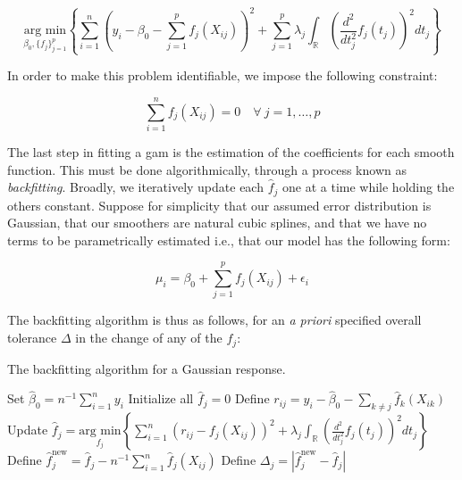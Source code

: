 \documentclass{report}
\begin{document}
\begin{equation}\label{eq:glm-gam-optimization-problem}
    \underset{\beta_0, \{f_j\}_{j=1}^p}{\text{arg min}} \left\{\sum_{i=1}^n \left(y_i - \beta_0 - \sum_{j=1}^p f_j(X_{ij})\right)^2 + \sum_{j=1}^p \lambda_j \int_{\mathbb{R}} \left(\frac{d^2}{dt_j^2} f_j(t_j)\right)^2 dt_j\right\}
\end{equation}

In order to make this problem identifiable, we impose the following constraint:

\begin{equation}\label{eq:glm-gam-optimization-problem-constraint}
    \sum_{i=1}^n f_j(X_{ij}) = 0 \quad \forall \: j = 1, \dots, p
\end{equation}

The last step in fitting a \gls{gam} is the estimation of the coefficients for each smooth function. This must be done algorithmically, through a process known as \textit{backfitting}. Broadly, we iteratively update each $\hat{f}_j$ one at a time while holding the others constant. Suppose for simplicity that our assumed error distribution is Gaussian, that our smoothers are natural cubic splines, and that we have no terms to be parametrically estimated i.e., that our model has the following form:

\begin{equation}\label{eq:glm-gam-model-form-gaussian}
    \mu_i = \beta_0 + \sum_{j=1}^p f_j(X_{ij}) + \epsilon_i
\end{equation}

The backfitting algorithm is thus as follows, for an \textit{a priori} specified overall tolerance $\Delta$ in the change of any of the $f_j$:

\begin{algorithm}[h!]
    \caption{The backfitting algorithm for a Gaussian response.}\label{alg:backfitting-gaussian}
    \begin{algorithmic}[1]
        \STATE Set $\hat{\beta}_0 = n^{-1} \sum_{i=1}^n y_i$
        \STATE Initialize all $\hat{f}_j = 0$
                \STATE Define $r_{ij} = y_i - \hat{\beta}_0 - \sum_{k \neq j} \hat{f}_k(X_{ik})$
                \STATE Update $\hat{f}_j = \underset{f_j}{\text{arg min}} \left\{\sum_{i=1}^n \left(r_{ij} - f_j(X_{ij})\right)^2 + \lambda_j \int_{\mathbb{R}} \left(\frac{d^2}{dt_j^2} f_j(t_j)\right)^2 dt_j\right\}$
                \STATE Define $\hat{f}_j^{\text{new}} = \hat{f}_j - n^{-1} \sum_{i=1}^n \hat{f}_j(X_{ij})$
                \STATE Define $\Delta_j = \left|\hat{f}_j^{\text{new}} - \hat{f}_j\right|$
            \ENDFOR
        \ENDWHILE
    \end{algorithmic}
\end{algorithm}
\end{document}
